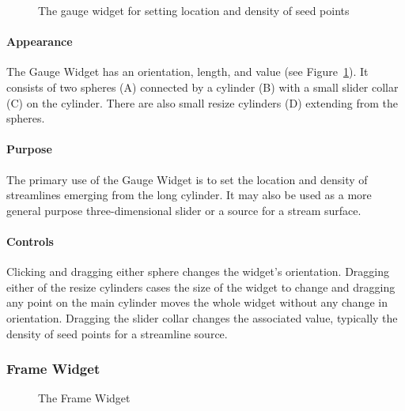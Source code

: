 \begin{figure}[htb]
  \begin{makeimage}
  \end{makeimage}
  \gaugewidget
  \caption{\label{fig:gaugewidget} The gauge widget for setting location and
    density of seed points}
\end{figure}

\paragraph{Appearance} The Gauge
Widget has an orientation, length, and value (see Figure~\ref{fig:gaugewidget}). It consists of two spheres (A) connected by a cylinder (B) with a
small slider collar (C) on the cylinder.  There are also small resize
cylinders (D) extending from the spheres.

\paragraph{Purpose} The primary use of the Gauge Widget is to set the
location and density of streamlines emerging from the long cylinder.  It
may also be used as a more general purpose three-dimensional slider or a
source for a stream surface. 

\paragraph{Controls} Clicking and dragging either sphere changes the widget's orientation.  Dragging either of the resize
cylinders cases the size of the widget to change and dragging any point on
the main cylinder moves the whole widget without any change in orientation.
Dragging the slider collar changes the associated value, typically the
density of seed points for a streamline source.

\subsubsection{Frame Widget}
\label{sec:view-framewidget} 

\begin{figure}[htb]
  \begin{makeimage}
  \end{makeimage}
  \framewidget
  \caption{\label{fig:framewidget} The Frame Widget}
\end{figure}



